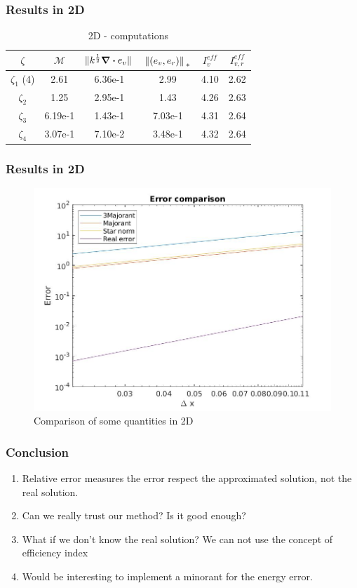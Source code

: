 \documentclass[t]{beamer}
\begin{document}
\begin{frame}[c]
    \frametitle{Results in 2D}
    \begin{table}[c]
          \begin{tabular}{c | c | c | c | c | c } 
            $\zeta$ & $\mathcal{M}$  & $\norm*{k^{\frac{1}{2}}\div e_v}$ & $\norm*{(e_v,e_r)}_{*}$ & $I_v^{eff}$ & $I_{v,r}^{eff}$ \\
            \hline \hline
            $\zeta_1$ (4) & 2.61 & 6.36e-1 & 2.99 & 4.10 & 2.62 \\ 
            $\zeta_2$ & 1.25 & 2.95e-1 & 1.43 & 4.26 & 2.63 \\
            $\zeta_3$ & 6.19e-1 & 1.43e-1& 7.03e-1 & 4.31 & 2.64 \\
            $\zeta_4$ & 3.07e-1 & 7.10e-2 & 3.48e-1 & 4.32 & 2.64 \\
          \end{tabular}
          \caption{2D - computations}
      \end{table}

\end{frame}

\begin{frame}
	\frametitle{Results in 2D}
	\begin{figure}[t]
		\centering
		\includegraphics[width = 0.7\linewidth]{../../Images/errorcomparison2d.jpg}
		\caption{Comparison of some quantities in 2D}
	\end{figure}
\end{frame}

\begin{frame}
\frametitle{Conclusion}
\begin{enumerate}
	\item Relative error measures the error respect the approximated solution, not the real solution.
	\item Can we really trust our method? Is it good enough?
	\item What if we don't know the real solution? We can not use the concept of efficiency index
	\item Would be interesting to implement a minorant for the energy error.
\end{enumerate}
\end{frame}
\end{document}
